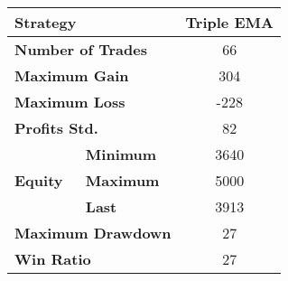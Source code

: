 \centering
\begin{tabular}{ll|c}
    \toprule
    \multicolumn{2}{l|}{\textbf{Strategy}} & Triple EMA \\
    \midrule
    \multicolumn{2}{l|}{\textbf{Number of Trades}} & 66 \\
    \multicolumn{2}{l|}{\textbf{Maximum Gain}} & 304 \\
    \multicolumn{2}{l|}{\textbf{Maximum Loss}} & -228 \\
    \multicolumn{2}{l|}{\textbf{Profits Std.}} & 82 \\
    \multirow{3}{*}{\textbf{Equity}} & \textbf{Minimum} & 3640 \\
    & \textbf{Maximum} & 5000 \\
    & \textbf{Last}    & 3913 \\
    \multicolumn{2}{l|}{\textbf{Maximum Drawdown}} & 27 \\
    \multicolumn{2}{l|}{\textbf{Win Ratio}} & 27 \\
    \bottomrule
\end{tabular}
